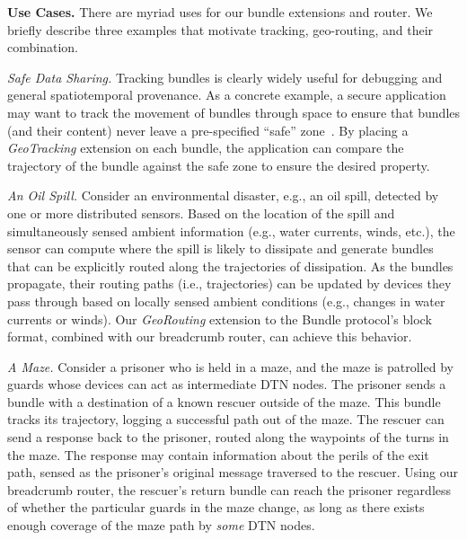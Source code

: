 %
%

{\bf Use Cases.} There are myriad uses for our bundle extensions and
router. We briefly describe three examples that motivate tracking,
geo-routing, and their combination.

{\it Safe Data Sharing.} Tracking bundles is clearly widely useful for
debugging and general spatiotemporal provenance. As a concrete
example, a secure application may want to track the movement of
bundles through space to ensure that bundles (and their content) never
leave a pre-specified ``safe'' zone~\cite{michel12:spatiotemporal}. By
placing a {\em GeoTracking} extension on each bundle, the application
can compare the trajectory of the bundle against the safe zone to
ensure the desired property.

{\it An Oil Spill.} Consider an environmental disaster, e.g., an oil
spill, detected by one or more distributed sensors. Based on the
location of the spill and simultaneously sensed ambient information
(e.g., water currents, winds, etc.), the sensor can compute where the
spill is likely to dissipate and generate bundles that can be
explicitly routed along the trajectories of dissipation. As the
bundles propagate, their routing paths (i.e., trajectories) can be
updated by devices they pass through based on locally sensed ambient
conditions (e.g., changes in water currents or winds). Our {\em
  GeoRouting} extension to the Bundle protocol's block format,
combined with our {\sc breadcrumb} router, can achieve this behavior.

{\it A Maze.} 
Consider a prisoner who is held in a maze, and the maze is patrolled by guards whose devices can act as intermediate DTN nodes. The prisoner sends a bundle with a destination of a known rescuer outside of the maze. This bundle tracks its trajectory, logging a successful path out of the maze. The rescuer can send a response back to the prisoner, routed along the waypoints of the turns in the maze. The response may contain information about the perils of the exit path, sensed as the prisoner's original message traversed to the rescuer. Using our {\sc breadcrumb} router, the rescuer's return bundle can reach the prisoner regardless of whether the particular guards in the maze change, as long as there exists enough coverage of the maze path by {\em some} DTN nodes.






